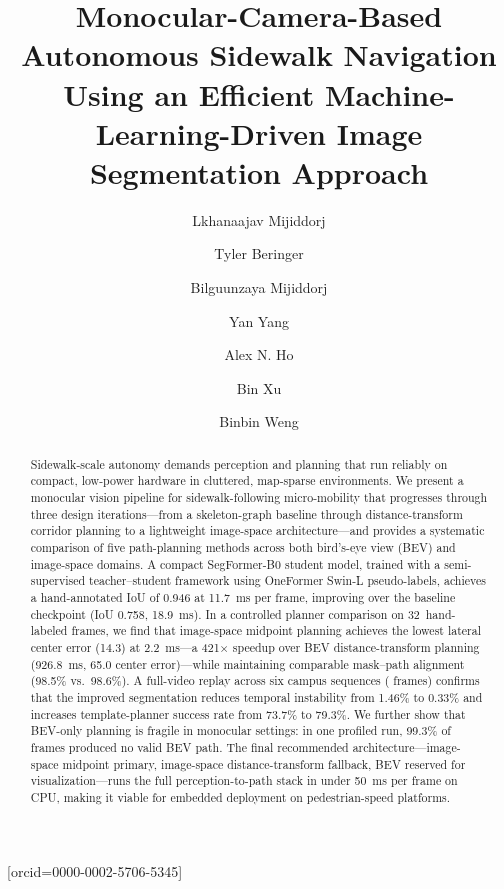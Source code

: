 \documentclass[a4paper,fleqn,10pt]{cas-dc}
\begin{document}
\title[mode=title]{Monocular-Camera-Based Autonomous Sidewalk Navigation Using an Efficient Machine-Learning-Driven Image Segmentation Approach}

\author[1]{Lkhanaajav Mijiddorj}

\author[1]{Tyler Beringer}
\author[1]{Bilguunzaya Mijiddorj}
\author[1]{Yan Yang}
\author[1]{Alex N. Ho}
\author[2]{Bin Xu}
\author[1]{Binbin Weng\cormark[1]}[orcid=0000-0002-5706-5345]

\address[1]{Department of Electrical and Computer Engineering, University of Oklahoma, Norman, OK, USA}
\address[2]{Department of Aerospace and Mechanical Engineering, University of Oklahoma, Norman, OK, USA}




\begin{abstract}
Sidewalk-scale autonomy demands perception and planning that run reliably on compact, low-power hardware in cluttered, map-sparse environments.
We present a monocular vision pipeline for sidewalk-following micro-mobility that progresses through three design iterations---from a skeleton-graph baseline through distance-transform corridor planning to a lightweight image-space architecture---and provides a systematic comparison of five path-planning methods across both bird's-eye view (BEV) and image-space domains.
A compact SegFormer-B0 student model, trained with a semi-supervised teacher--student framework using OneFormer Swin-L pseudo-labels, achieves a hand-annotated IoU of 0.946 at \SI{11.7}{ms} per frame, improving over the baseline checkpoint (IoU 0.758, \SI{18.9}{ms}).
In a controlled planner comparison on 32~hand-labeled frames, we find that image-space midpoint planning achieves the lowest lateral center error (\SI{14.3}{\px}) at \SI{2.2}{ms}---a 421$\times$ speedup over BEV distance-transform planning (\SI{926.8}{ms}, \SI{65.0}{\px} center error)---while maintaining comparable mask--path alignment (98.5\% vs.\ 98.6\%).
A full-video replay across six campus sequences ( frames) confirms that the improved segmentation reduces temporal instability from 1.46\% to 0.33\% and increases template-planner success rate from 73.7\% to 79.3\%.
We further show that BEV-only planning is fragile in monocular settings: in one profiled run, 99.3\% of frames produced no valid BEV path.
The final recommended architecture---image-space midpoint primary, image-space distance-transform fallback, BEV reserved for visualization---runs the full perception-to-path stack in under \SI{50}{ms} per frame on CPU, making it viable for embedded deployment on pedestrian-speed platforms.
\end{abstract}
\end{document}
